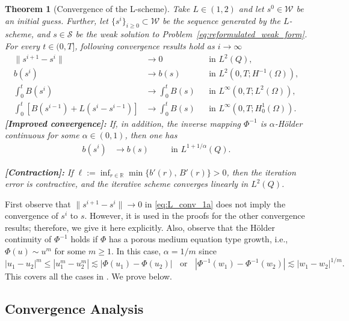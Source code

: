 \documentclass[review,11pt]{article}
\numberwithin{equation}{section}
\def \a  {\alpha}
\def \calS {\mathcal{S}}
\def \calW {\mathcal{W}}
\newtheorem{theorem}[theorem]{Theorem}
\begin{document}
\begin{theorem}[Convergence of the L-scheme]\label{theo:converegence}
Take $L \in (1,2)$ and let $s^0\in \calW$ be an initial guess. Further, let $\{s^i\}_{i\ge 0}\subset \calW$ be the sequence generated by the $L$-scheme, and $s\in \calS$ be the weak solution to Problem~\ref{eq:reformulated_weak_form}. For every $t\in(0,T]$, following convergence results hold as $i \to \infty$
\begin{subequations}\label{eq:L_conv_1}
    \begin{align}
\|s^{i+1}-s^{i}\| &\longrightarrow 0
&&\text{in } L^2(Q),\label{eq:L_conv_1a}\\
b(s^i) &\longrightarrow b(s)
&&\text{in } L^2(0,T;H^{-1}(\Omega)),\\
\int_0^t B(s^i) &\longrightarrow \int_0^t B(s)
&&\text{in } L^\infty(0,T;L^2(\Omega)),\\
\int_0^t [B(s^{i-1}) + L(s^i-s^{i-1})]& \longrightarrow \int_0^t B(s) &&\text{in } L^\infty(0,T;H^1_0(\Omega)).
\end{align}
\end{subequations}
\textbf{[Improved convergence]:} If, in addition, the inverse mapping $\Phi^{-1}$ is $\a$-H\"older continuous for some $\a\in (0,1)$, then one has
\begin{align}\label{eq:L_conv_2}
b(s^i) &\longrightarrow b(s)
\quad &&\text{in } L^{1 + 1/\a}(Q).
\end{align}

\textbf{[Contraction]:}
If \( \ell := \inf_{r\in\mathbb{R}} \min\{b'(r),\, B'(r)\} > 0 \), then the iteration error is contractive,
and the iterative scheme converges linearly in ${L^2(Q)}$. 
\end{theorem}

First observe that $\|s^{i+1}-s^{i}\| \longrightarrow 0$ in \eqref{eq:L_conv_1a} does not imply the convergence of $s^i$ to $s$. However, it is used in the proofs for the other convergence results; therefore, we give it here explicitly. Also, observe that the H\"older continuity of $\Phi^{-1}$ holds if $\Phi$ has a porous medium equation type growth, i.e., $\Phi(u)\sim u^m$ for some $m\geq 1$. In this case, $\a=1/m$ since 
\[
|u_1-u_2|^m \leq |u_1^m-u_2^m|\lesssim |\Phi(u_1)-\Phi(u_2)|\;\; \text{ or }\;\; |\Phi^{-1}(w_1)-\Phi^{-1}(w_2)|\lesssim |w_1-w_2|^{1/m}.
\]
This covers all the cases in .
We prove  below.  

\subsection{Convergence Analysis}\label{sec:convergence-proof}
\end{document}
